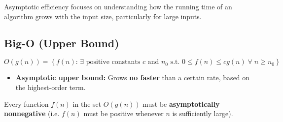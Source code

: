 Asymptotic efficiency focuses on understanding how the running time of an algorithm grows with the input size, particularly for large inputs.
\subsection{Big-O (Upper Bound)}
    \begin{definition} 
        $ O(g(n)) = \left\{ f(n) \text{: } \exists \text{ positive constants } c \text{ and } n_0 \text{ s.t. } 0 \leq f(n) \leq c g(n) \; \forall \; n \geq n_0 \right\} $
        \begin{itemize}
            \item \textbf{Asymptotic upper bound:} Grows \textbf{no faster} than a certain rate, based on the highest-order term.
        \end{itemize}
    \end{definition}

    \begin{warning}
        Every function $f(n)$ in the set $O(g(n))$ must be \textbf{asymptotically nonnegative} (i.e. $f(n)$ must be positive whenever $n$ is sufficiently large).
    \end{warning}

